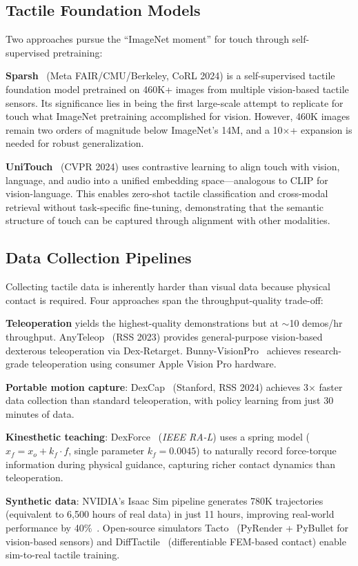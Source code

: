\subsection{Tactile Foundation Models}

Two approaches pursue the ``ImageNet moment'' for touch through self-supervised pretraining:

\textbf{Sparsh}~\cite{higuera2024sparsh} (Meta FAIR/CMU/Berkeley, CoRL 2024) is a self-supervised tactile foundation model pretrained on 460K+ images from multiple vision-based tactile sensors. Its significance lies in being the first large-scale attempt to replicate for touch what ImageNet pretraining accomplished for vision. However, 460K images remain two orders of magnitude below ImageNet's 14M, and a 10$\times$+ expansion is needed for robust generalization.

\textbf{UniTouch}~\cite{yang2024unitouch} (CVPR 2024) uses contrastive learning to align touch with vision, language, and audio into a unified embedding space---analogous to CLIP for vision-language. This enables zero-shot tactile classification and cross-modal retrieval without task-specific fine-tuning, demonstrating that the semantic structure of touch can be captured through alignment with other modalities.

\subsection{Data Collection Pipelines}

Collecting tactile data is inherently harder than visual data because physical contact is required. Four approaches span the throughput-quality trade-off:

\textbf{Teleoperation} yields the highest-quality demonstrations but at $\sim$10 demos/hr throughput. AnyTeleop~\cite{qin2023anyteleop} (RSS 2023) provides general-purpose vision-based dexterous teleoperation via Dex-Retarget. Bunny-VisionPro~\cite{ding2024bunny} achieves research-grade teleoperation using consumer Apple Vision Pro hardware.

\textbf{Portable motion capture}: DexCap~\cite{wang2024dexcap} (Stanford, RSS 2024) achieves 3$\times$ faster data collection than standard teleoperation, with policy learning from just 30 minutes of data.

\textbf{Kinesthetic teaching}: DexForce~\cite{chen2025dexforce} (\emph{IEEE RA-L}) uses a spring model ($x_f = x_o + k_f \cdot f$, single parameter $k_f = 0.0045$) to naturally record force-torque information during physical guidance, capturing richer contact dynamics than teleoperation.

\textbf{Synthetic data}: NVIDIA's Isaac Sim pipeline generates 780K trajectories (equivalent to 6{,}500 hours of real data) in just 11 hours, improving real-world performance by 40\%~\cite{nvidia2025synthetic}. Open-source simulators Tacto~\cite{wang2022tacto} (PyRender + PyBullet for vision-based sensors) and DiffTactile~\cite{si2024difftactile} (differentiable FEM-based contact) enable sim-to-real tactile training.
